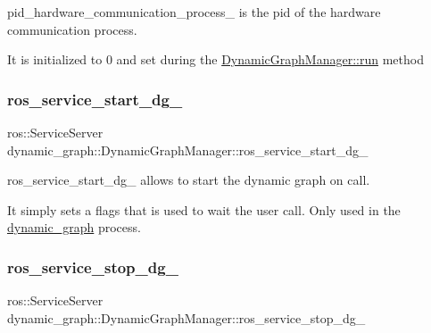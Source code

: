pid\+\_\+hardware\+\_\+communication\+\_\+process\+\_\+ is the pid of the hardware communication process. 

It is initialized to 0 and set during the \hyperlink{classdynamic__graph_1_1DynamicGraphManager_a93272fcbb3793dfc92422186022ecf72}{Dynamic\+Graph\+Manager\+::run} method \mbox{\label{classdynamic__graph_1_1DynamicGraphManager_adb99ba3a7a5e677b30531a69bcc922ec}} 
\subsubsection{\texorpdfstring{ros\+\_\+service\+\_\+start\+\_\+dg\+\_\+}{ros\_service\_start\_dg\_}}
{\footnotesize\ttfamily ros\+::\+Service\+Server dynamic\+\_\+graph\+::\+Dynamic\+Graph\+Manager\+::ros\+\_\+service\+\_\+start\+\_\+dg\+\_\+\hspace{0.3cm}{\ttfamily [protected]}}



ros\+\_\+service\+\_\+start\+\_\+dg\+\_\+ allows to start the dynamic graph on call. 

It simply sets a flags that is used to wait the user call. Only used in the \hyperlink{namespacedynamic__graph}{dynamic\+\_\+graph} process. \mbox{\label{classdynamic__graph_1_1DynamicGraphManager_adf973b6da4e4fe14cae262ba94ebb191}} 
\subsubsection{\texorpdfstring{ros\+\_\+service\+\_\+stop\+\_\+dg\+\_\+}{ros\_service\_stop\_dg\_}}
{\footnotesize\ttfamily ros\+::\+Service\+Server dynamic\+\_\+graph\+::\+Dynamic\+Graph\+Manager\+::ros\+\_\+service\+\_\+stop\+\_\+dg\+\_\+\hspace{0.3cm}{\ttfamily [protected]}}



